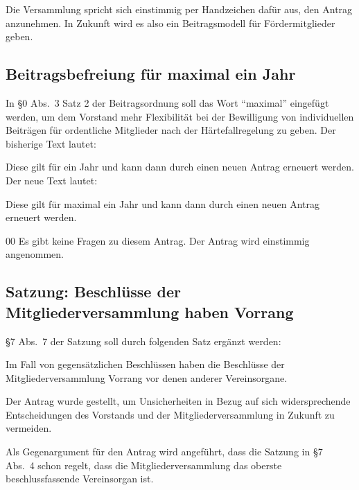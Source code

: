 \documentclass[a4paper,12pt]{scrartcl}
\renewenvironment{quote}{%
  \list{}{\rightmargin\leftmargin}%
    \item\small\itshape\relax%
}{%
  \endlist
}
\begin{document}

Die Versammlung spricht sich einstimmig per Handzeichen dafür aus, den Antrag
anzunehmen. In Zukunft wird es also ein Beitragsmodell für Fördermitglieder
geben.

\subsection{Beitragsbefreiung für maximal ein Jahr}

In §0 Abs.~3 Satz 2 der Beitragsordnung soll das Wort "`maximal"' eingefügt
werden, um dem Vorstand mehr Flexibilität bei der Bewilligung von individuellen
Beiträgen für ordentliche Mitglieder nach der Härtefallregelung zu geben. Der
bisherige Text lautet:
\begin{quote}
  Diese gilt für ein Jahr und kann dann durch einen neuen Antrag erneuert
  werden.
\end{quote}
Der neue Text lautet:
\begin{quote}
  Diese gilt für maximal ein Jahr und kann dann durch einen neuen Antrag
  erneuert werden.
\end{quote}

0{0}
Es gibt keine Fragen zu diesem Antrag. Der Antrag wird einstimmig angenommen.

\subsection{Satzung: Beschlüsse der Mitgliederversammlung haben Vorrang}

§7 Abs.~7 der Satzung soll durch folgenden Satz ergänzt werden:
\begin{quote}
  Im Fall von gegensätzlichen Beschlüssen haben die Beschlüsse der
  Mitgliederversammlung Vorrang vor denen anderer Vereinsorgane.
\end{quote}

Der Antrag wurde gestellt, um Unsicherheiten in Bezug auf sich widersprechende
Entscheidungen des Vorstands und der Mitgliederversammlung in Zukunft zu
vermeiden.

Als Gegenargument für den Antrag wird angeführt, dass die Satzung in §7 Abs.~4
schon regelt, dass die Mitgliederversammlung das oberste beschlussfassende
Vereinsorgan ist.
\end{document}
